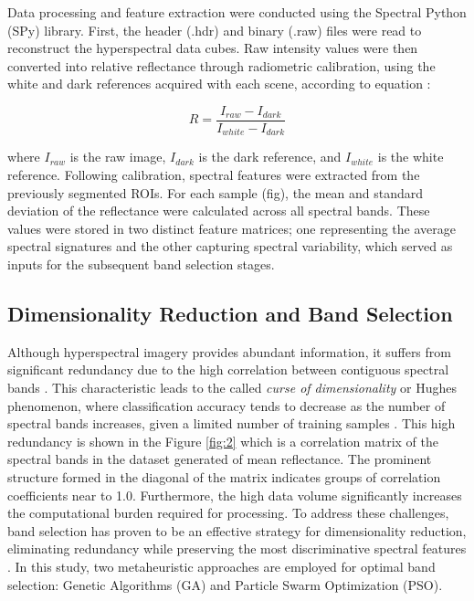 \documentclass[ASNA,twocolumn]{USG}
\begin{document}
Data processing and feature extraction were conducted using the Spectral Python (SPy) library. 
First, the header (.hdr) and binary (.raw) files were read to reconstruct the hyperspectral data cubes. 
Raw intensity values were then converted into relative reflectance through radiometric calibration, using the white and dark references acquired with each scene, according to equation \cite{morales_laboratory_2022}:

\begin{equation}
    R=\dfrac{I_{raw}-I_{dark}}{I_{white}-I_{dark}}
\end{equation}

where $I_{raw}$ is the raw image, $I_{dark}$ is the dark reference, and $I_{white}$ is the white reference. 
Following calibration, spectral features were extracted from the previously segmented ROIs. 
For each sample (fig), the mean and standard deviation of the reflectance were calculated across all spectral bands. 
These values were stored in two distinct feature matrices; one representing the average spectral signatures and the other capturing spectral variability, which served as inputs for the subsequent band selection stages.

\subsection{Dimensionality Reduction and Band Selection}

Although hyperspectral imagery provides abundant information, it suffers from significant redundancy due to the high correlation between contiguous spectral bands \cite{sawant_survey_2020}. 
This characteristic leads to the called \textit{curse of dimensionality} or Hughes phenomenon, where classification accuracy tends to decrease as the number of spectral bands increases, given a limited number of training samples \cite{hughes_mean_1968}. 
This high redundancy is shown in the Figure \ref{fig:2} which is a correlation matrix of the spectral bands in the dataset generated of mean reflectance. 
The prominent structure formed in the diagonal of the matrix indicates groups of correlation coefficients near to 1.0. 
Furthermore, the high data volume significantly increases the computational burden required for processing. 
To address these challenges, band selection has proven to be an effective strategy for dimensionality reduction, eliminating redundancy while preserving the most discriminative spectral features \cite{sawant_survey_2020, nagasubramanian_hyperspectral_2018}. 
In this study, two metaheuristic approaches are employed for optimal band selection: Genetic Algorithms (GA) and Particle Swarm Optimization (PSO). 
\end{document}
